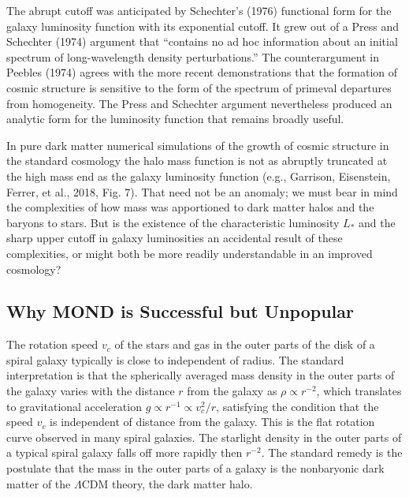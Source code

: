 \documentclass[fleqn,usenatbib]{mnras}
\begin{document}
The abrupt cutoff was anticipated by Schechter's (1976) functional form for the galaxy luminosity function with its exponential cutoff. It grew out of a Press and Schechter (1974) argument that ``contains no ad hoc information about an initial spectrum of long-wavelength density perturbations.'' The counterargument in Peebles (1974) agrees with the more recent demonstrations that the formation of cosmic structure is sensitive to the form of the spectrum of primeval departures from homogeneity. The Press and Schechter argument nevertheless produced an analytic form for the luminosity function that remains broadly useful.

In pure dark matter numerical simulations of the growth of cosmic structure in the standard cosmology the halo mass function is not as abruptly truncated at the high mass end as the galaxy luminosity function (e.g., Garrison, Eisenstein, Ferrer, et al., 2018, Fig. 7). That need not be an anomaly; we must bear in mind  the complexities of how mass was apportioned to dark matter halos and the baryons to stars. But is the existence of the characteristic luminosity $L_\ast$ and the sharp upper cutoff in galaxy luminosities an accidental result of these complexities, or might both be more readily understandable in an improved cosmology?

\subsection{Why MOND is Successful but Unpopular}\label{MOND} 

The rotation speed $v_c$ of the stars and gas in the outer parts of the disk of a spiral galaxy typically is close to independent of radius. The standard interpretation is that the spherically averaged mass density in the outer parts of the galaxy varies with the distance $r$ from the galaxy as $\rho\propto r^{-2}$, which translates to gravitational acceleration $g\propto r^{-1}\propto v_c^2/r$, satisfying the condition that the speed $v_c$ is independent of distance from the galaxy. This is the flat rotation curve observed in many spiral galaxies. The starlight density in the outer parts of a typical spiral galaxy falls off more rapidly then $r^{-2}$. The standard remedy is the postulate that the mass in the outer parts of a galaxy is the nonbaryonic dark matter of the $\Lambda$CDM theory, the dark matter halo.
\end{document}
